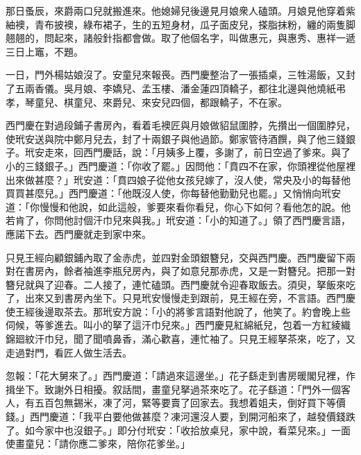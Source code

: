 那日蚤辰，來爵兩口兒就搬進來。他媳婦兒後邊見月娘衆人磕頭。月娘見他穿着紫紬襖，青布披襖，綠布裙子，生的五短身材，瓜子面皮兒，搽脂抹粉，纏的兩隻脚翹翹的，問起來，諸般針指都會做。取了他個名字，叫做惠元，與惠秀、惠祥一遞三日上竈，不題。

一日，門外楊姑娘沒了。安童兒來報䘮。西門慶整治了一張插桌，三牲湯飯，又封了五兩香儀。吳月娘、李嬌兒、孟玉樓、潘金蓮四頂轎子，都往北邊與他燒紙弔孝，琴童兒、棋童兒、來爵兒、來安兒四個，都跟轎子，不在家。

西門慶在對過段鋪子書房內，看着毛襖匠與月娘做貂鼠圍脖，先攢出一個圍脖兒，使玳安送與院中鄭月兒去，封了十兩銀子與他過節。鄭家管待酒饌，與了他三錢銀子。玳安走來，回西門慶話，說：「月姨多上覆，多謝了，前日空過了爹來。與了小的三錢銀子。」西門慶道：「你收了罷。」因問他：「賁四不在家，你頭裡從他屋裡出來做甚麼？」玳安道：「賁四娘子從他女孩兒嫁了，沒人使，常央及小的每替他買買甚麼兒。」西門慶道：「他既沒人使，你每替他勤勤兒也罷。」又悄悄向玳安道：「你慢慢和他說，如此這般，爹要來看你看兒，你心下如何？看他怎的說。他若肯了，你問他討個汗巾兒來與我。」玳安道：「小的知道了。」領了西門慶言語，應諾下去。西門慶就走到家中來。

只見王經向顧銀鋪內取了金赤虎，並四對金頭銀簪兒，交與西門慶。西門慶留下兩對在書房內，餘者袖進李瓶兒房內，與了如意兒那赤虎，又是一對簪兒。把那一對簪兒就與了迎春。二人接了，連忙磕頭。西門慶就令迎春取飯去。須臾，拏飯來吃了，出來又到書房內坐下。只見玳安慢慢走到跟前，見王經在旁，不言語。西門慶使王經後邊取茶去。那玳安方說：「小的將爹言語對他說了，他笑了。約會晚上些伺候，等爹進去。叫小的拏了這汗巾兒來。」西門慶見紅綿紙兒，包着一方紅綾織錦廻紋汗巾兒，聞了聞噴鼻香，滿心歡喜，連忙袖了。只見王經拏茶來，吃了，又走過對門，看匠人做生活去。

忽報：「花大舅來了。」西門慶道：「請過來這邊坐。」花子繇走到書房暖閣兒裡，作揖坐下。致謝外日相擾。叙話間，畫童兒拏過茶來吃了。花子繇道：「門外一個客人，有五百包無錫米，凍了河，緊等要賣了回家去。我想着姐夫，倒好買下等價錢。」西門慶道：「我平白要他做甚麼？凍河還沒人要，到開河船來了，越發價錢跌了。如今家中也沒銀子。」即分付玳安：「收拾放桌兒，家中說，看菜兒來。」一面使畫童兒：「請你應二爹來，陪你花爹坐。」

